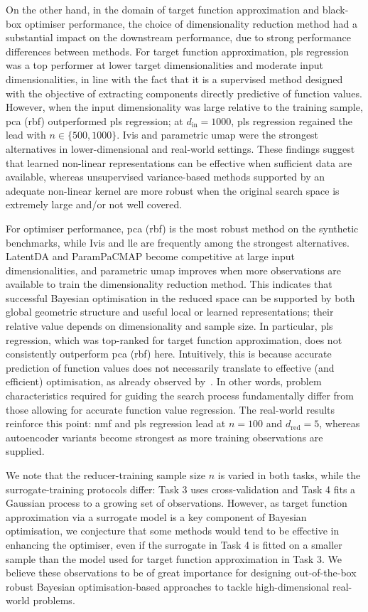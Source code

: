 On the other hand, in the domain of target function approximation and black-box optimiser performance, the choice of dimensionality reduction method had a substantial impact on the downstream performance, due to strong performance differences between methods.
For target function approximation, \gls{pls} regression was a top performer at lower target dimensionalities and moderate input dimensionalities, in line with the fact that it is a supervised method designed with the objective of extracting components directly predictive of function values.
However, when the input dimensionality was large relative to the training sample, \gls{pca} (\gls{rbf}) outperformed \gls{pls} regression; at $d_{\mathrm{in}}=1000$, \gls{pls} regression regained the lead with $n\in\{500,1000\}$.
Ivis and parametric \gls{umap} were the strongest alternatives in lower-dimensional and real-world settings. These findings suggest that learned non-linear representations can be effective when sufficient data are available, whereas unsupervised variance-based methods supported by an adequate non-linear kernel are more robust when the original search space is extremely large and/or not well covered.

For optimiser performance, \gls{pca} (\gls{rbf}) is the most robust method on the synthetic benchmarks, while Ivis and \gls{lle} are frequently among the strongest alternatives. LatentDA and ParamPaCMAP become competitive at large input dimensionalities, and parametric \gls{umap} improves when more observations are available to train the dimensionality reduction method.
This indicates that successful Bayesian optimisation in the reduced space can be supported by both global geometric structure and useful local or learned representations; their relative value depends on dimensionality and sample size.
In particular, \gls{pls} regression, which was top-ranked for target function approximation, does not consistently outperform \gls{pca} (\gls{rbf}) here.
Intuitively, this is because accurate prediction of function values does not necessarily translate to effective (and efficient) optimisation, as already observed by~\citet{FeuEtAl18b}.
In other words, problem characteristics required for guiding the search process fundamentally differ from those allowing for accurate function value regression. The real-world results reinforce this point: \gls{nmf} and \gls{pls} regression lead at $n=100$ and $d_{\mathrm{red}}=5$, whereas autoencoder variants become strongest as more training observations are supplied.

We note that the reducer-training sample size $n$ is varied in both tasks, while the surrogate-training protocols differ: Task 3 uses cross-validation and Task 4 fits a Gaussian process to a growing set of observations.
However, as target function approximation via a surrogate model is a key component of Bayesian optimisation, we conjecture that some methods would tend to be effective in enhancing the optimiser, even if the surrogate in Task 4 is fitted on a smaller sample than the model used for target function approximation in Task 3.
We believe these observations to be of great importance for designing out-of-the-box robust Bayesian optimisation-based approaches to tackle high-dimensional real-world problems.

